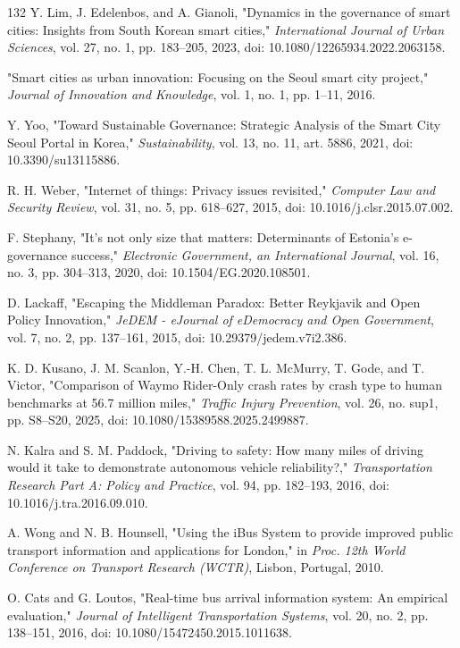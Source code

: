 \documentclass[pdflatex,sn-mathphys-num]{sn-jnl}%
\theoremstyle{thmstyleone}%
\theoremstyle{thmstyletwo}%
\theoremstyle{thmstylethree}%
\begin{document}
\begin{thebibliography}{132}
 Y. Lim, J. Edelenbos, and A. Gianoli, "Dynamics in the governance of smart cities: Insights from South Korean smart cities," \emph{International Journal of Urban Sciences}, vol. 27, no. 1, pp. 183--205, 2023, doi: 10.1080/12265934.2022.2063158.

 "Smart cities as urban innovation: Focusing on the Seoul smart city project," \emph{Journal of Innovation and Knowledge}, vol. 1, no. 1, pp. 1--11, 2016.

 Y. Yoo, "Toward Sustainable Governance: Strategic Analysis of the Smart City Seoul Portal in Korea," \emph{Sustainability}, vol. 13, no. 11, art. 5886, 2021, doi: 10.3390/su13115886.

 R. H. Weber, "Internet of things: Privacy issues revisited," \emph{Computer Law and Security Review}, vol. 31, no. 5, pp. 618--627, 2015, doi: 10.1016/j.clsr.2015.07.002.

 F. Stephany, "It's not only size that matters: Determinants of Estonia's e-governance success," \emph{Electronic Government, an International Journal}, vol. 16, no. 3, pp. 304--313, 2020, doi: 10.1504/EG.2020.108501.

 D. Lackaff, "Escaping the Middleman Paradox: Better Reykjavik and Open Policy Innovation," \emph{JeDEM - eJournal of eDemocracy and Open Government}, vol. 7, no. 2, pp. 137--161, 2015, doi: 10.29379/jedem.v7i2.386.

 K. D. Kusano, J. M. Scanlon, Y.-H. Chen, T. L. McMurry, T. Gode, and T. Victor, "Comparison of Waymo Rider-Only crash rates by crash type to human benchmarks at 56.7 million miles," \emph{Traffic Injury Prevention}, vol. 26, no. sup1, pp. S8--S20, 2025, doi: 10.1080/15389588.2025.2499887.

 N. Kalra and S. M. Paddock, "Driving to safety: How many miles of driving would it take to demonstrate autonomous vehicle reliability?," \emph{Transportation Research Part A: Policy and Practice}, vol. 94, pp. 182--193, 2016, doi: 10.1016/j.tra.2016.09.010.

 A. Wong and N. B. Hounsell, "Using the iBus System to provide improved public transport information and applications for London," in \emph{Proc. 12th World Conference on Transport Research (WCTR)}, Lisbon, Portugal, 2010.

 O. Cats and G. Loutos, "Real-time bus arrival information system: An empirical evaluation," \emph{Journal of Intelligent Transportation Systems}, vol. 20, no. 2, pp. 138--151, 2016, doi: 10.1080/15472450.2015.1011638.


\end{thebibliography}
\end{document}
